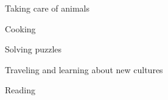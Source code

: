 



\cventry
{} %
{} %
{} %
{} %
{ %
\begin{cvitems}
  \item {Taking care of animals}
  \item {Cooking}
  \item {Solving puzzles}
  \item {Traveling and learning about new cultures}
  \item {Reading}
\end{cvitems}
}


